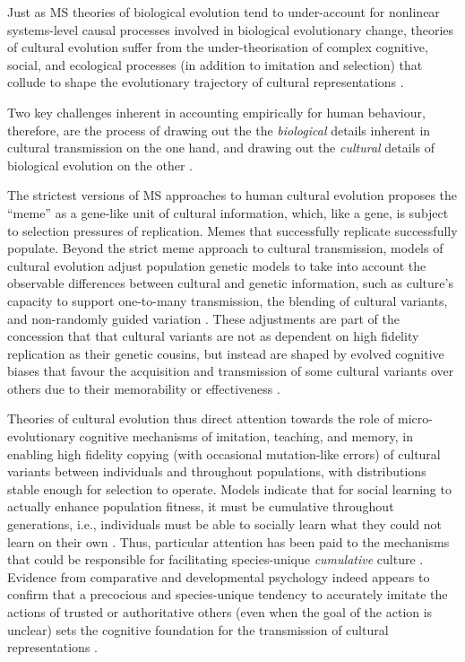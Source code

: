 Just as MS theories of biological evolution tend to under-account for nonlinear systems-level causal processes involved in biological evolutionary change, theories of cultural evolution suffer from the under-theorisation of complex cognitive, social, and ecological processes (in addition to imitation and selection) that collude to shape the evolutionary trajectory of cultural representations \citep{Mesoudi2017}.

Two key challenges inherent in accounting empirically for human behaviour, therefore, are the process of drawing out the the \textit{biological} details inherent in cultural transmission on the one hand, and drawing out the \textit{cultural} details of biological evolution on the other \citep{Claidiere2014,Fuentes2016a}.

The strictest versions of MS approaches to human cultural evolution proposes the ``meme'' as a gene-like unit of cultural information, which, like a gene, is subject to selection pressures of replication.  Memes that successfully replicate successfully populate\citep{Dawkins1976}.  Beyond the strict meme approach to cultural transmission, models of cultural evolution adjust population genetic models to take into account the observable differences between cultural and genetic information, such as culture's capacity to support one-to-many transmission, the blending of cultural variants, and non-randomly guided variation \citep{Cavalli-Sforza1981,Boyd1988}.  These adjustments are part of the concession that that cultural variants are not as dependent on high fidelity replication as their genetic cousins, but instead are shaped by evolved cognitive biases that favour the acquisition and transmission of some cultural variants over others due to their memorability or effectiveness \citep{Henrich2007}.

Theories of cultural evolution thus direct attention towards the role of micro-evolutionary cognitive mechanisms of imitation, teaching, and memory, in enabling high fidelity copying (with occasional mutation-like errors) of cultural variants between individuals and throughout populations, with distributions stable enough for selection to operate.  Models indicate that for social learning to actually enhance population fitness, it must be cumulative throughout generations, i.e., individuals must be able to socially learn what they could not learn on their own \citep{Boyd1995}.  Thus, particular attention has been paid to the mechanisms that could be responsible for facilitating species-unique \textit{cumulative} culture \citep{Tomasello2008}.  Evidence from comparative and developmental psychology indeed appears to confirm that a precocious and species-unique tendency to accurately imitate the actions of trusted or authoritative others (even when the goal of the action is unclear) sets the cognitive foundation for the transmission of cultural representations \citep{Tomasello2014a}.

